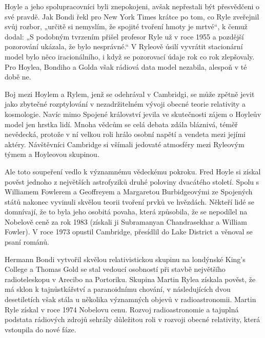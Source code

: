   Hoyle a jeho spolupracovníci byli znepokojeni, avšak nepřestali být přesvědčeni o své pravdě.
  Jak Bondi řekl pro New York Times krátce po tom, co Ryle zveřejnil svůj rozbor, „určitě si
  nemyslím, že spojité tvoření hmoty je mrtvé“, k čemuž dodal: „S podobným tvrzením přišel profesor
  Ryle už v roce 1955 a pozdější pozorování ukázala, že bylo nesprávné.“ V Ryleově úsilí vyvrátit
  stacionární model bylo něco iracionálního, i když se pozorovací údaje rok co rok zlepšovaly. Pro
  Hoylea, Bondiho a Golda však rádiová data model nezabila, alespoň v té době ne.

  Boj mezi Hoylem a Rylem, jenž se odehrával v Cambridgi, se může zpětně jevit jako zbytečné
  rozptylování v nezadržitelném vývoji obecné teorie relativity a kosmologie. Navíc mimo Spojené
  království jevila ve skutečnosti zájem o Hoyleův model jen hrstka lidí. Mnoha vědcům se celá
  debata zdála bláznivá, téměř nevědecká, protože v ní velkou roli hrálo osobní napětí a vendeta
  mezi jejími aktéry. Návštěvníci Cambridge si všímali jedovaté atmosféry mezi Ryleovým týmem a
  Hoyleovou skupinou. 

  Ale toto soupeření vedlo k významnému vědeckému pokroku. Fred Hoyle si získal pověst jednoho z
  největších astrofyziků druhé poloviny dvacátého století. Spolu s Williamem Fowlerem a Geoffreyem a
  Margaretou Burbidgeovými ze Spojených států nakonec vyvinuli skvělou teorii tvoření prvků ve
  hvězdách. Někteří lidé se domnívají, že to byla jeho osobitá povaha, která způsobila, že se
  nepodílel na Nobelově ceně za rok 1983 (získali ji Subramanyan Chandrasekhar a William Fowler). V
  roce 1973 opustil Cambridge, přesídlil do Lake District a věnoval se psaní románů. 

  Hermann Bondi vytvořil skvělou relativistickou skupinu na londýnské King’s College a Thomas Gold
  se stal vedoucí osobností při stavbě největšího radioteleskopu v Arecibo na Portoriku. Skupina
  Martin Rylea získala pověst, že má sklon k tajnůstkářství a paranoidnímu chování, v následujících
  dvou desetiletích však stála u několika významných objevů v radioastronomii. Martin Ryle získal
  v roce 1974 Nobelovu cenu. Rozvoj radioastronomie a tajuplná podstata rádiových zdrojů sehrály
  důležitou roli v rozvoji obecné relativity, která vstoupila do nové fáze.

